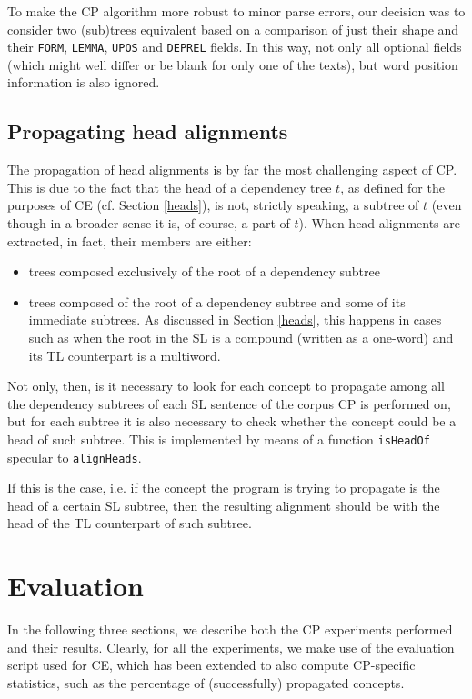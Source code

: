 To make the CP algorithm more robust to minor parse errors, our decision was to consider two (sub)trees equivalent based on a comparison of just their shape and their \texttt{FORM}, \texttt{LEMMA}, \texttt{UPOS} and \texttt{DEPREL} fields. 
In this way, not only all optional fields (which might well differ or be blank for only one of the texts), but word position information is also ignored. 

\subsection{Propagating head alignments} \label{heads2}
The propagation of head alignments is by far the most challenging aspect of CP. 
This is due to the fact that the head of a dependency tree $t$, as defined for the purposes of CE (cf. Section \ref{heads}), is not, strictly speaking, a subtree of $t$ (even though in a broader sense it is, of course, a part of $t$). When head alignments are extracted, in fact, their members are either: \smallskip

\begin{itemize}
    \item trees composed exclusively of the root of a dependency subtree
    \item trees composed of the root of a dependency subtree and some of its immediate subtrees. As discussed in Section \ref{heads}, this happens in cases such as when the root in the SL is a compound (written as a one-word) and its TL counterpart is a multiword.
\end{itemize} \smallskip

Not only, then, is it necessary to look for each concept to propagate among all the dependency subtrees of each SL sentence of the corpus CP is performed on, but for each subtree it is also necessary to check whether the concept could be a head of such subtree. This is implemented by means of a function \texttt{isHeadOf} specular to \texttt{alignHeads}. \smallskip

If this is the case, i.e. if the concept the program is trying to propagate is the head of a certain SL subtree, then the resulting alignment should be with the head of the TL counterpart of such subtree.

\section{Evaluation} \label{eval3}
In the following three sections, we describe both the CP experiments performed and their results. Clearly, for all the experiments, we make use of the evaluation script used for CE, which has been extended to also compute CP-specific statistics, such as the percentage of (successfully) propagated concepts.

